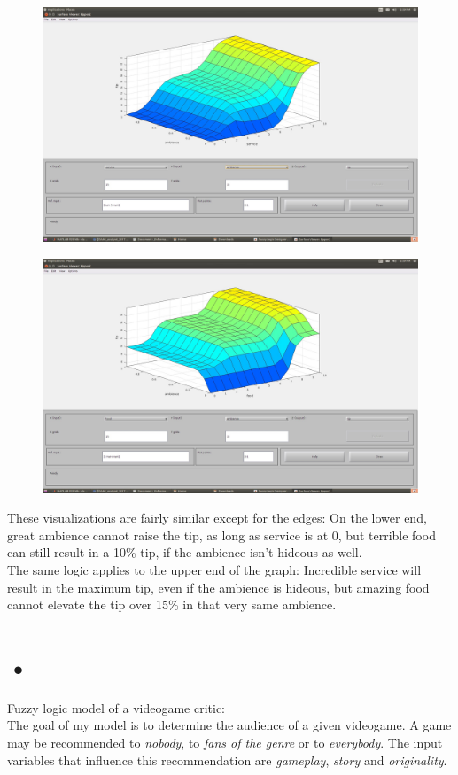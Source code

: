 \documentclass[a4paper, 11pt]{article}
\begin{document}
\begin{figure}[ht]
\includegraphics[scale=0.15]{ambience-surface-s.jpg}
\end{figure}

\begin{figure}[ht]
\includegraphics[scale=0.15]{ambience-surface-f.jpg}
\end{figure}

These visualizations are fairly similar except for the edges: On the lower end, great ambience cannot raise the tip, as long as service is at 0, but terrible food can still result in a 10\% tip, if the ambience isn't hideous as well.\\
The same logic applies to the upper end of the graph: Incredible service will result in the maximum tip, even if the ambience is hideous, but amazing food cannot elevate the tip over 15\% in that very same ambience.

\newpage

\section{•}
Fuzzy logic model of a videogame critic:\\
The goal of my model is to determine the audience of a given videogame. A game may be recommended to \textit{nobody}, to \textit{fans of the genre} or to \textit{everybody}. The input variables that influence this recommendation are \textit{gameplay}, \textit{story} and \textit{originality}.
\end{document}
